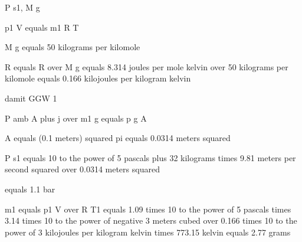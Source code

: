 P s1, M g

p1 V equals m1 R T

M g equals 50 kilograms per kilomole

R equals R over M g equals 8.314 joules per mole kelvin over 50 kilograms per kilomole equals 0.166 kilojoules per kilogram kelvin

damit GGW 1

P amb A plus j over m1 g equals p g A

A equals (0.1 meters) squared pi equals 0.0314 meters squared

P s1 equals 10 to the power of 5 pascals plus 32 kilograms times 9.81 meters per second squared over 0.0314 meters squared

equals 1.1 bar

m1 equals p1 V over R T1 equals 1.09 times 10 to the power of 5 pascals times 3.14 times 10 to the power of negative 3 meters cubed over 0.166 times 10 to the power of 3 kilojoules per kilogram kelvin times 773.15 kelvin equals 2.77 grams